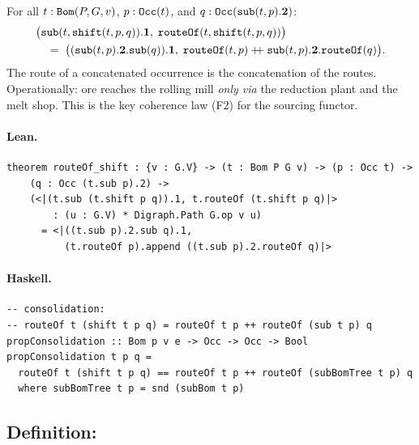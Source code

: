 \documentclass[11pt,a4paper]{article}
\begin{document}
\begin{thm}
For all $t : \texttt{Bom}(P, G, v)$, $p : \texttt{Occ}(t)$, and $q :
\texttt{Occ}(\texttt{sub}(t, p).\mathbf{2})$:
\begin{align*}
  &\bigl(\texttt{sub}(t, \texttt{shift}(t, p, q)).\mathbf{1},\;
    \texttt{routeOf}(t, \texttt{shift}(t, p, q))\bigr) \\
  &\quad=\;
  \bigl((\texttt{sub}(t, p).\mathbf{2}.\texttt{sub}(q)).\mathbf{1},\;
    \texttt{routeOf}(t, p) \mathbin{+\!\!+}
    \texttt{sub}(t, p).\mathbf{2}.\texttt{routeOf}(q)\bigr).
\end{align*}
The route of a concatenated occurrence is the concatenation of the routes.
Operationally: ore reaches the rolling mill \emph{only via} the reduction
plant and the melt shop.  This is the key coherence law (F2) for the sourcing
functor.
\end{thm}

\paragraph{Lean.}
\begin{lstlisting}[style=lean]
theorem routeOf_shift : {v : G.V} -> (t : Bom P G v) -> (p : Occ t) ->
    (q : Occ (t.sub p).2) ->
    (<|(t.sub (t.shift p q)).1, t.routeOf (t.shift p q)|>
        : (u : G.V) * Digraph.Path G.op v u)
      = <|((t.sub p).2.sub q).1,
          (t.routeOf p).append ((t.sub p).2.routeOf q)|>
\end{lstlisting}

\paragraph{Haskell.}
\begin{lstlisting}[style=haskell]
-- consolidation:
-- routeOf t (shift t p q) = routeOf t p ++ routeOf (sub t p) q
propConsolidation :: Bom p v e -> Occ -> Occ -> Bool
propConsolidation t p q =
  routeOf t (shift t p q) == routeOf t p ++ routeOf (subBomTree t p) q
  where subBomTree t p = snd (subBom t p)
\end{lstlisting}


\subsection{Definition: }
\end{document}
